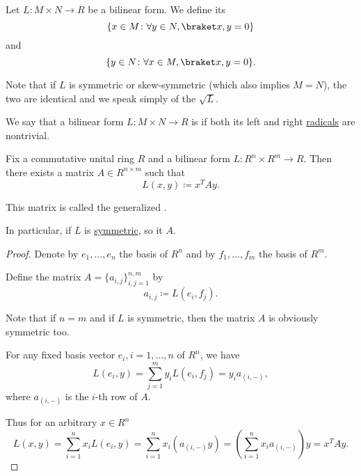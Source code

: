 \begin{definition}\label{def:bilinear_form_radicals}
  Let \( L: M \times N \to R \) be a bilinear form. We define its 
  \begin{equation*}
    \{ x \in M \colon \forall y \in N, \inner x y = 0 \}
  \end{equation*}
  and 
  \begin{equation*}
    \{ y \in N \colon \forall x \in M, \inner x y = 0 \}.
  \end{equation*}

  Note that if \( L \) is symmetric or skew-symmetric (which also implies \( M = N \)), the two are identical and we speak simply of the  \( \sqrt L \).
\end{definition}

\begin{definition}\label{def:nondegenerate_bilinear_form}
  We say that a bilinear form \( L: M \times N \to R \) is  if both its left and right \hyperref[def:bilinear_form_radicals]{radicals} are nontrivial.
\end{definition}

\begin{theorem}\label{thm:bilinear_form_matrix_presentation}
  Fix a commutative unital ring \( R \) and a bilinear form \( L: R^n \times R^m \to R \). Then there exists a matrix \( A \in R^{n \times m} \) such that
  \begin{equation*}
    L(x, y) \coloneqq x^T A y.
  \end{equation*}

  This matrix is called the generalized .

  In particular, if \( L \) is \hyperref[def:symmetric_function]{symmetric}, so it \( A \).
\end{theorem}
\begin{proof}
  Denote by \( e_1, \ldots, e_n \) the basis of \( R^n \) and by \( f_1, \ldots, f_m \) the basis of \( R^m \).

  Define the matrix \( A = \{ a_{i,j} \}_{i,j=1}^{n,m} \) by
  \begin{equation*}
    a_{i,j} \coloneqq L(e_i, f_j).
  \end{equation*}

  Note that if \( n = m \) and if \( L \) is symmetric, then the matrix \( A \) is obviously symmetric too.

  For any fixed basis vector \( e_i, i = 1, \ldots, n \) of \( R^n \), we have
  \begin{equation*}
    L(e_i, y)
    =
    \sum_{j=1}^m y_i L(e_i, f_j)
    =
    y_i a_{(i,-)},
  \end{equation*}
  where \( a_{(i,-)} \) is the \( i \)-th row of \( A \).

  Thus for an arbitrary \( x \in R^n \)
  \begin{equation*}
    L(x, y)
    =
    \sum_{i=1}^n x_i L(e_i, y)
    =
    \sum_{i=1}^n x_i (a_{(i,-)} y)
    =
    \left( \sum_{i=1}^n x_i a_{(i,-)} \right) y
    =
    x^T A y.
  \end{equation*}
\end{proof}

